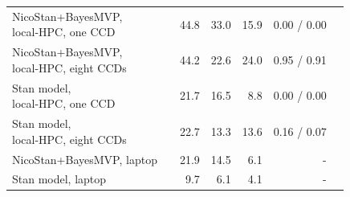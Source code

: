 \begin{table}[H]
{\begin{tabular}{llrrrrr}
\makecell[tl]{NicoStan+BayesMVP, \\ local-HPC, one CCD} & & 44.8 & 33.0 & 15.9 & 0.00 / 0.00 & \\
\makecell[tl]{NicoStan+BayesMVP, \\ local-HPC, eight CCDs} & & 44.2 & 22.6 & 24.0 & 0.95 / 0.91 & \\
\makecell[tl]{Stan model, \\ local-HPC, one CCD} & & 21.7 & 16.5 & 8.8 & 0.00 / 0.00 & \\
\makecell[tl]{Stan model, \\ local-HPC, eight CCDs} & & 22.7 & 13.3 & 13.6 & 0.16 / 0.07 & \\
NicoStan+BayesMVP, laptop & & 21.9 & 14.5 & 6.1 & - & \\
Stan model, laptop & & 9.7 & 6.1 & 4.1 & - & \\
\hline
\end{tabular}
}
\end{table}
